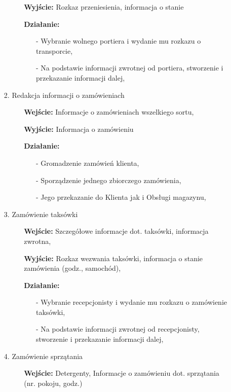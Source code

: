 \documentclass[a4paper, 11pt]{article}
\begin{document}
\begin{enumerate}[label*=\arabic*.]
\begin{enumerate}[label*=\arabic*.]
\begin{enumerate}[label*=\arabic*.]
\begin{itemize}
					\item [\textbf{Wyjście:}] Rozkaz przeniesienia, informacja o stanie
					\item [\textbf{Działanie:}] 
					\begin{itemize}
						\item[-] Wybranie wolnego portiera i wydanie mu rozkazu o transporcie,
						\item[-] Na podstawie informacji zwrotnej od portiera, stworzenie i przekazanie informacji dalej,
					\end{itemize}
				\end{itemize}
				\item Redakcja informacji o zamówieniach
				\begin{itemize}
					\item [\textbf{Wejście:}] Informacje o zamówieniach wszelkiego sortu, 
					\item [\textbf{Wyjście:}] Informacja o zamówieniu
					\item [\textbf{Działanie:}] 
					\begin{itemize}
						\item[-] Gromadzenie zamówień klienta,
						\item[-] Sporządzenie jednego zbiorczego zamówienia,
						\item[-] Jego przekazanie do Klienta jak i Obsługi magazynu,
					\end{itemize}
				\end{itemize}
				\item Zamówienie taksówki
				\begin{itemize}
					\item [\textbf{Wejście:}] Szczegółowe informacje dot. taksówki, informacja zwrotna,
					\item [\textbf{Wyjście:}] Rozkaz wezwania taksówki, informacja o stanie zamówienia (godz., samochód),
					\item [\textbf{Działanie:}] 
					\begin{itemize}
						\item[-] Wybranie recepcjonisty i wydanie mu rozkazu o zamówienie taksówki,
						\item[-] Na podstawie informacji zwrotnej od recepcjonisty, stworzenie i przekazanie informacji dalej,
					\end{itemize}
				\end{itemize}
				\item Zamówienie sprzątania
				\begin{itemize}
					\item [\textbf{Wejście:}] Detergenty, Informacje o zamówieniu dot. sprzątania (nr. pokoju, godz.)

\end{itemize}
\end{enumerate}
\end{enumerate}
\end{enumerate}
\end{document}
